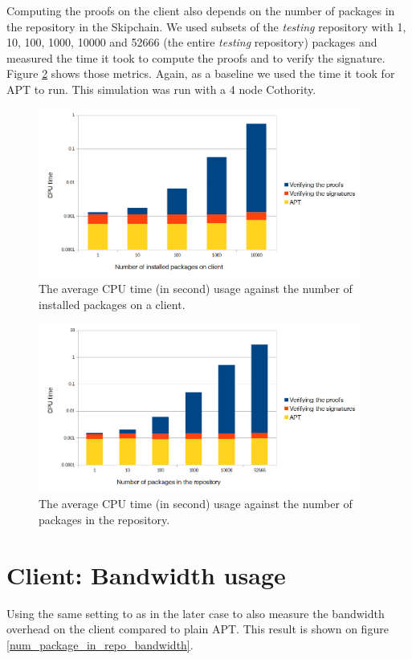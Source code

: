 \documentclass[11pt, upma4paper, twoside, openany, parskip=half]{book}
\begin{document}
Computing the proofs on the client also depends on the number of packages in the repository in the Skipchain. We used subsets of the \emph{testing} repository with 1, 10, 100, 1000, 10000 and 52666 (the entire \emph{testing} repository) packages and measured the time it took to compute the proofs and to verify the signature. Figure \ref{num_package_in_repo} shows those metrics. Again, as a baseline we used the time it took for APT to run. This simulation was run with a 4 node Cothority.

\begin{figure}[H]
	\centering
	\includegraphics[width=300pt]{client_CPU_measures_num_packages.png}
	\caption{The average CPU time (in second) usage against the number of installed packages on a client.}
	\label{num_packages_installed}
\end{figure}

\begin{figure}[H]
	\centering
	\includegraphics[width=300pt]{client_CPU_measures.png}
	\caption{The average CPU time (in second) usage against the number of packages in the repository.}
	\label{num_package_in_repo}
\end{figure}

\section{Client: Bandwidth usage}

Using the same setting to as in the later case to also measure the bandwidth overhead on the client compared to plain APT. This result is shown on figure \ref{num_package_in_repo_bandwidth}.
\end{document}
